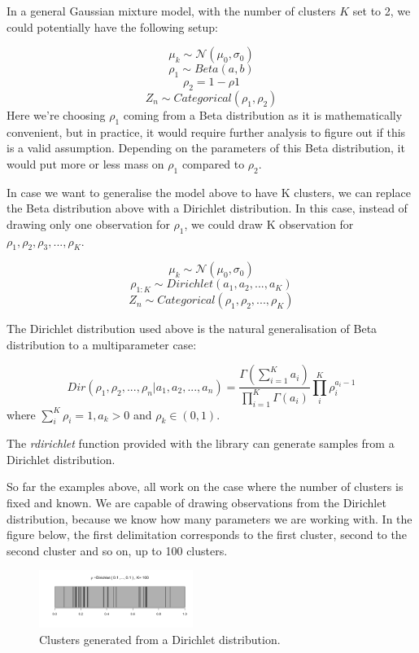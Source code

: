 \documentclass{article}
\begin{document}
In a general Gaussian mixture model, with the number of clusters $K$ set to 2, we could potentially have the following setup: 

$$\mu_{k} \sim \mathcal{N}(\mu_{0}, \sigma_{0})$$ 
$$\rho_{1} \sim Beta(a, b)$$
$$\rho_{2} = 1 - \rho{1}$$ 
$$Z_{n} \sim Categorical(\rho_{1}, \rho_{2})$$
Here we're choosing $\rho_{1}$ coming from a Beta distribution as it is mathematically convenient, but in practice, it would require further analysis to figure out if this is a valid assumption. Depending on the parameters of this Beta distribution, it would put more or less mass on $\rho_{1}$ compared to $\rho_{2}$.

In case we want to generalise the model above to have K clusters, we can replace the Beta distribution above with a Dirichlet distribution. In this case, instead of drawing only one observation for $\rho_{1}$, we could draw K observation for $\rho_{1}, \rho_{2}, \rho_{3}, ..., \rho_{K}$.

$$\mu_{k} \sim \mathcal{N}(\mu_{0}, \sigma_{0})$$ 
$$\rho_{1:K} \sim Dirichlet(a_{1}, a_{2}, ..., a_{K})$$
$$Z_{n} \sim Categorical(\rho_{1}, \rho_{2}, ... ,\rho_{K})$$

The Dirichlet distribution used above is the natural generalisation of Beta distribution to a multiparameter case:

$$ Dir(\rho_{1}, \rho_{2}, ..., \rho_{n}| a_{1}, a_{2}, ..., a_{n}) = \frac{\Gamma(\sum_{i=1}^{K}a_{i})}{\prod_{i=1}^{K}\Gamma(a_{i})}\prod_{i}^{K}\rho_{i}^{a_{i} - 1}$$ where
$\sum_{i}^{K} \rho_{i} = 1, a_{k} > 0$ and $\rho_{k} \in (0, 1)$.

The \textit{rdirichlet} function provided with the library can generate samples from a Dirichlet distribution.

So far the examples above, all work on the case where the number of clusters is fixed and known. We are capable of drawing observations from the Dirichlet distribution, because we know how many parameters we are working with. In the figure below, the first delimitation corresponds to the first cluster, second to the second cluster and so on, up to 100 clusters.

\begin{figure} [H]
    \begin{center}
        \includegraphics[scale=1, width=5cm]{stacked_dirichlet.png}
        \caption{Clusters generated from a Dirichlet distribution.}
        \label{fig:stacked_dirichlet}
    \end{center}
\end{figure}
\end{document}
